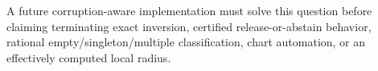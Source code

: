 A future corruption-aware implementation must solve this question before claiming terminating exact inversion, certified release-or-abstain behavior, rational empty/singleton/multiple classification, chart automation, or an effectively computed local radius.